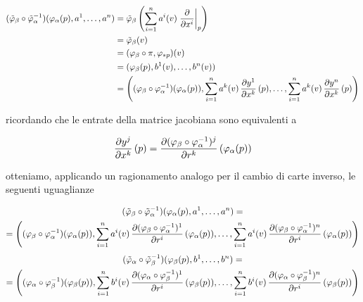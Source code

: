 \begin{align}
	\begin{split}
		(\tilde{\varphi}_{\beta} \circ \tilde{\varphi}_{\alpha}^{-1}) (\varphi_{\alpha}(p), a^{1},\dots,a^{n}) &= \tilde{\varphi}_{\beta} \left( \sum_{i=1}^{n} a^{i}(v) \eval{ \pdv{x^{i}} }_{p} \right) \\
		&= \tilde{\varphi}_{\beta}(v) \\
		&= (\varphi_{\beta} \circ \pi, \varphi_{*p})(v) \\
		&= ( \varphi_{\beta}(p), b^{1}(v),\dots,b^{n}(v) ) \\
		&= \left( (\varphi_{\beta} \circ \varphi_{\alpha}^{-1})(\varphi_{\alpha}(p)), \sum_{i=1}^{n} a^{k}(v) \, \pdv{y^{1}}{x^{k}} \, (p) ,\dots, \sum_{i=1}^{n} a^{k}(v) \, \pdv{y^{n}}{x^{k}} \, (p) \right)
	\end{split}
\end{align}

ricordando che le entrate della matrice jacobiana sono equivalenti a

\begin{equation}
	\pdv{y^{j}}{x^{k}} \, (p) = \pdv{(\varphi_{\beta} \circ \varphi_{\alpha}^{-1})^{j}}{r^{k}} \, (\varphi_{\alpha}(p))
\end{equation}

otteniamo, applicando un ragionamento analogo per il cambio di carte inverso, le seguenti uguaglianze

\begin{multline}
	(\tilde{\varphi}_{\beta} \circ \tilde{\varphi}_{\alpha}^{-1}) (\varphi_{\alpha}(p), a^{1},\dots,a^{n}) = \\
	= \left( (\varphi_{\beta} \circ \varphi_{\alpha}^{-1})(\varphi_{\alpha}(p)), \sum_{i=1}^{n} a^{i}(v) \, \pdv{(\varphi_{\beta} \circ \varphi_{\alpha}^{-1})^{1}}{r^{i}} \, (\varphi_{\alpha}(p)) ,\dots, \sum_{i=1}^{n} a^{i}(v) \, \pdv{(\varphi_{\beta} \circ \varphi_{\alpha}^{-1})^{n}}{r^{i}} \, (\varphi_{\alpha}(p)) \right)
\end{multline}
%
\begin{multline}
	(\tilde{\varphi}_{\alpha} \circ \tilde{\varphi}_{\beta}^{-1}) (\varphi_{\beta}(p), b^{1},\dots,b^{n}) = \\
	= \left( (\varphi_{\alpha} \circ \varphi_{\beta}^{-1})(\varphi_{\beta}(p)), \sum_{i=1}^{n} b^{i}(v) \, \pdv{(\varphi_{\alpha} \circ \varphi_{\beta}^{-1})^{1}}{r^{i}} \, (\varphi_{\beta}(p)) ,\dots, \sum_{i=1}^{n} b^{i}(v) \, \pdv{(\varphi_{\alpha} \circ \varphi_{\beta}^{-1})^{n}}{r^{i}} \, (\varphi_{\beta}(p)) \right)
\end{multline}

